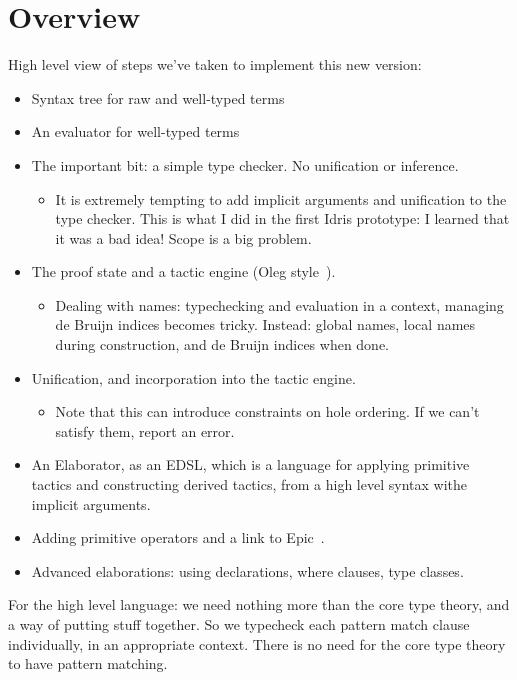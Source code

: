 \section{Overview}

High level view of steps we've taken to implement this new version:

\begin{itemize}
\item Syntax tree for raw and well-typed terms
\item An evaluator for well-typed terms
\item The important bit: a simple type checker. No unification or
  inference.
\begin{itemize}
  \item It is extremely tempting to add implicit arguments and unification to the
        type checker. This is what I did in the first Idris prototype: I learned
        that it was a bad idea! Scope is a big problem.
\end{itemize}
\item The proof state and a tactic engine (Oleg style~\cite{McBride1999}).
\begin{itemize}
  \item Dealing with names: typechecking and evaluation in a context, managing de Bruijn
        indices becomes tricky. Instead: global names, local names during construction,
        and de Bruijn indices when done.
\end{itemize}
\item Unification, and incorporation into the tactic engine.
\begin{itemize}
  \item Note that this can introduce constraints on hole ordering. If we can't satisfy them,
        report an error.
\end{itemize}
\item An Elaborator, as an EDSL, which is a language for applying primitive tactics and
      constructing derived tactics, from a high level syntax withe implicit arguments.
\item Adding primitive operators and a link to Epic~\cite{brady2011epic}.
\item Advanced elaborations: using declarations, where clauses, type classes.
\end{itemize}

For the high level language: we need nothing more than the core type theory,
and a way of putting stuff together. So we typecheck each pattern match clause
individually, in an appropriate context. There is no need for the core type
theory to have pattern matching.
